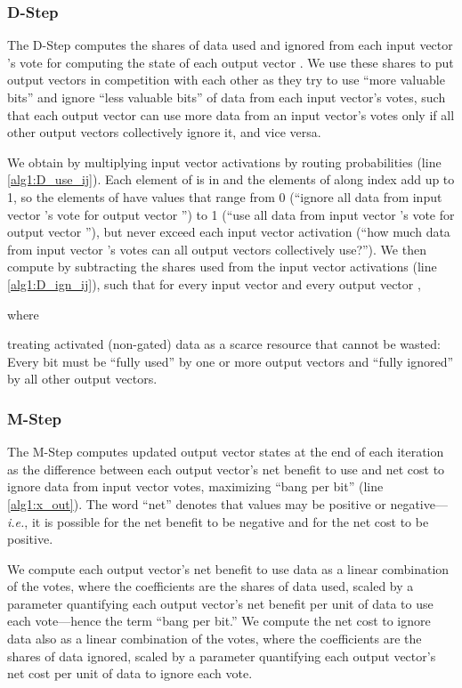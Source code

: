 \documentclass[11pt,a4paper]{article}
\begin{document}
\subsubsection{D-Step}\label{ssec:D_Step}

The D-Step computes the shares of data used  and ignored  from each input vector 's vote for computing the state of each output vector . We use these shares to put output vectors in competition with each other as they try to use ``more valuable bits'' and ignore ``less valuable bits'' of data from each input vector's votes, such that each output vector can use more data from an input vector's votes only if all other output vectors collectively ignore it, and vice versa.

We obtain  by multiplying input vector activations  by routing probabilities  (line \ref{alg1:D_use_ij}). Each element of  is in  and the elements of  along index  add up to 1, so the elements of  have values that range from 0 (``ignore all data from input vector 's vote for output vector '') to 1 (``use all data from input vector 's vote for output vector ''), but never exceed each input vector activation (``how much data from input vector 's votes can all output vectors collectively use?''). We then compute  by subtracting the shares used from the input vector activations (line \ref{alg1:D_ign_ij}), such that for every input vector  and every output vector ,



where



treating activated (non-gated) data as a scarce resource that cannot be wasted: Every bit must be ``fully used'' by one or more output vectors and ``fully ignored'' by all other output vectors.

\subsubsection{M-Step}

The M-Step computes updated output vector states  at the end of each iteration as the difference between each output vector's net benefit to use and net cost to ignore data from input vector votes, maximizing ``bang per bit'' (line \ref{alg1:x_out}). The word ``net'' denotes that values may be positive or negative---{\em i.e.}, it is possible for the net benefit to be negative and for the net cost to be positive.

We compute each output vector's net benefit to use data as a linear combination of the votes, where the coefficients are the shares of data used, scaled by a parameter  quantifying each output vector's net benefit per unit of data to use each vote---hence the term ``bang per bit.'' We compute the net cost to ignore data also as a linear combination of the votes, where the coefficients are the shares of data ignored, scaled by a parameter  quantifying each output vector's net cost per unit of data to ignore each vote.
\end{document}
